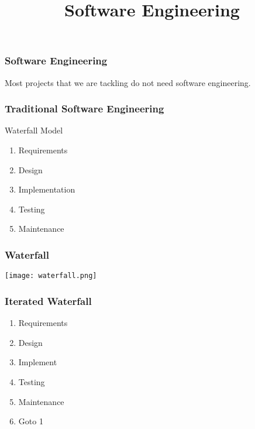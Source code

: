 
\title{Software Engineering}

\frame{\maketitle}

\begin{frame}[fragile]
\frametitle{Software Engineering}
Most projects that we are tackling do not need software engineering.

\end{frame}

\begin{frame}[fragile]
\frametitle{Traditional Software Engineering}

\begin{block}{Waterfall Model}
\begin{enumerate}
\item Requirements
\item Design
\item Implementation
\item Testing
\item Maintenance
\end{enumerate}
\end{block}
\end{frame}

\begin{frame}[fragile]
\frametitle{Waterfall}

\centering
\texttt{[image: waterfall.png]}

\end{frame}

\begin{frame}[fragile]
\frametitle{Iterated Waterfall}

\begin{enumerate}
\item Requirements
\item Design
\item Implement
\item Testing
\item Maintenance
\item Goto 1
\end{enumerate}
\end{frame}

